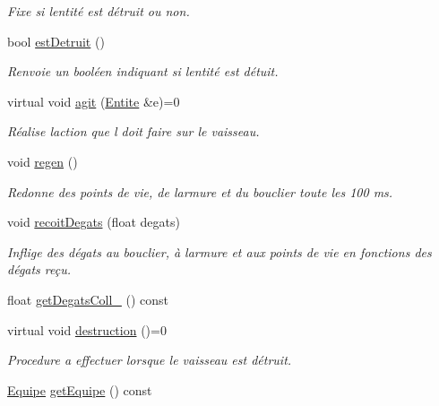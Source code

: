 \begin{DoxyCompactItemize}
\begin{DoxyCompactList}\small\item\em Fixe si l\textquotesingle{}entité est détruit ou non. \end{DoxyCompactList}\item 
bool \mbox{\hyperlink{class_entite_a282ac7b723e1594f49d27337a872f348}{est\+Detruit}} ()
\begin{DoxyCompactList}\small\item\em Renvoie un booléen indiquant si l\textquotesingle{}entité est détuit. \end{DoxyCompactList}\item 
virtual void \mbox{\hyperlink{class_entite_a848ec47afac1d7ba970a2bcab5dc7b3b}{agit}} (\mbox{\hyperlink{class_entite}{Entite}} \&e)=0
\begin{DoxyCompactList}\small\item\em Réalise l\textquotesingle{}action que l doit faire sur le vaisseau. \end{DoxyCompactList}\item 
void \mbox{\hyperlink{class_entite_a0107313e662166fddddb8ffefeb649fe}{regen}} ()
\begin{DoxyCompactList}\small\item\em Redonne des points de vie, de l\textquotesingle{}armure et du bouclier toute les 100 ms. \end{DoxyCompactList}\item 
void \mbox{\hyperlink{class_entite_ab16c58f618b3b854310f92f044cc4a17}{recoit\+Degats}} (float degats)
\begin{DoxyCompactList}\small\item\em Inflige des dégats au bouclier, à l\textquotesingle{}armure et aux points de vie en fonctions des dégats reçu. \end{DoxyCompactList}\item 
float \mbox{\hyperlink{class_entite_a57bef183cc6104b6b7b8a2048880552f}{get\+Degats\+Coll\+\_\+}} () const
\item 
virtual void \mbox{\hyperlink{class_entite_af5c424f69b2c880ae9c12786abd28592}{destruction}} ()=0
\begin{DoxyCompactList}\small\item\em Procedure a effectuer lorsque le vaisseau est détruit. \end{DoxyCompactList}\item 
\mbox{\hyperlink{constantes_8h_a08fa5554288d5031a8f3bb83cc04ee83}{Equipe}} \mbox{\hyperlink{class_entite_a44612e23e1c45af3e865fa039875df1e}{get\+Equipe}} () const

\end{DoxyCompactItemize}
